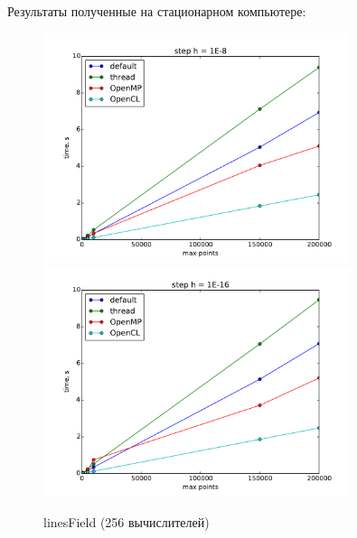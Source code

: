 \documentclass[14pt,final,titlepage,pscyr]{hedwork}
\begin{document}
Результаты полученные на стационарном компьютере:
\begin{figure}[ht!]
    \center
    \includegraphics[width=0.8\textwidth]{linesField_my_1E-8}
    \includegraphics[width=0.8\textwidth]{linesField_my_1E-16}
    \caption{linesField (256 вычислителей)}
\end{figure}

\pagebreak
\end{document}
